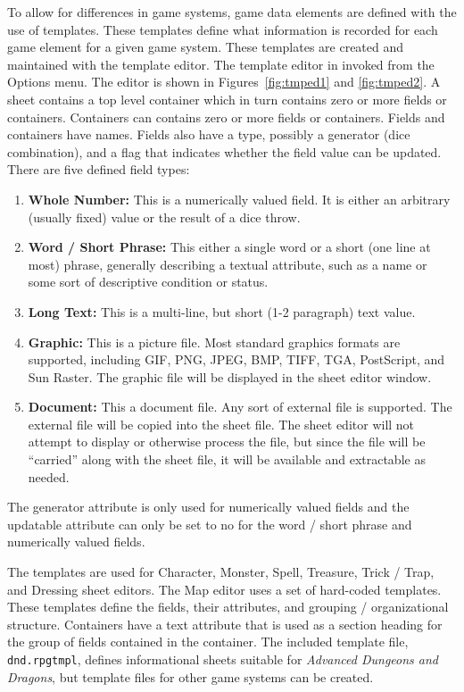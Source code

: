 To allow for differences in game systems, game data elements are
defined with the use of templates.  These templates define what
information is recorded for each game element for a given game system. 
These templates are created and maintained with the template editor. 
The template editor in invoked from the Options menu.  The editor is
shown in Figures~\ref{fig:tmped1} and \ref{fig:tmped2}.  A sheet
contains a top level container which in turn contains zero or more fields
or containers.  Containers can contains zero or more fields or
containers.  Fields and containers have names. Fields also have a type,
possibly a generator (dice combination), and a flag that indicates whether the
field value can be updated.  There are five defined field types:

\begin{enumerate}
\item \textbf{Whole Number:} This is a numerically valued field. It is either
an arbitrary (usually fixed) value or the result of a dice throw.
\item \textbf{Word / Short Phrase:} This either a single word or a short
(one line at most) phrase, generally describing a textual attribute,
such as a name or some sort of descriptive condition or status.
\item \textbf{Long Text:} This is a multi-line, but short (1-2 paragraph)
text value.
\item \textbf{Graphic:} This is a picture file.  Most standard graphics
formats are supported, including GIF, PNG, JPEG, BMP, TIFF, TGA,
PostScript, and Sun Raster.  The graphic file will be displayed in the
sheet editor window.
\item \textbf{Document:} This a document file.  Any sort of external file
is supported.  The external file will be copied into the sheet file. 
The sheet editor will not attempt to display or otherwise process the
file, but since the file will be ``carried'' along with the sheet file,
it will be available and extractable as needed.
\end{enumerate}

The generator attribute is only used for numerically valued fields and
the updatable attribute can only be set to no for the word / short
phrase and numerically valued fields.

The templates are used for Character, Monster, Spell, Treasure, Trick /
Trap, and Dressing sheet editors.  The Map editor uses a set of hard-coded
templates. These templates define the fields, their attributes, and
grouping / organizational structure.  Containers have a text attribute
that is used as a section heading for the group of fields contained in
the container. The included template file, \verb=dnd.rpgtmpl=, defines
informational sheets suitable for \textit{Advanced Dungeons and
Dragons}, but template files for other game systems can be created.

